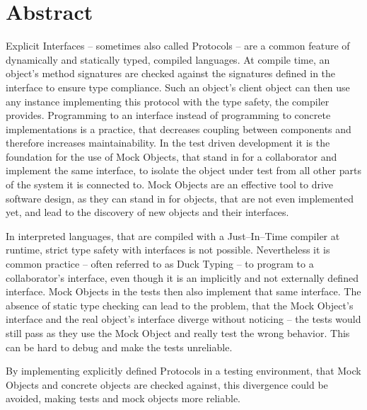 \begingroup
\let\clearpage\relax
\let\cleardoublepage\relax
\let\cleardoublepage\relax

\chapter*{Abstract}
Explicit Interfaces -- sometimes also called Protocols -- are a common feature of dynamically and statically typed, compiled languages. At compile time, an object’s method signatures are checked against the signatures defined in the interface to ensure type compliance. Such an object’s client object can then use any instance implementing this protocol with the type safety, the compiler provides. Programming to an interface instead of programming to concrete implementations is a practice, that decreases coupling between components and therefore increases maintainability. In the test driven development it is the foundation for the use of Mock Objects, that stand in for a collaborator and implement the same interface, to isolate the object under test from all other parts of the system it is connected to. Mock Objects are an effective tool to drive software design, as they can stand in for objects, that are not even implemented yet, and lead to the discovery of new objects and their interfaces.

In interpreted languages, that are compiled with a Just–In–Time compiler at runtime, strict type safety with interfaces is not possible. Nevertheless it is common practice – often referred to as Duck Typing – to program to a collaborator’s interface, even though it is an implicitly and not externally defined interface. Mock Objects in the tests then also implement that same interface. The absence of static type checking can lead to the problem, that the Mock Object’s interface and the real object’s interface diverge without noticing – the tests would still pass as they use the Mock Object and really test the wrong behavior. This can be hard to debug and make the tests unreliable.

By implementing explicitly defined Protocols in a testing environment, that Mock Objects and concrete objects are checked against, this divergence could be avoided, making tests and mock objects more reliable.

\endgroup